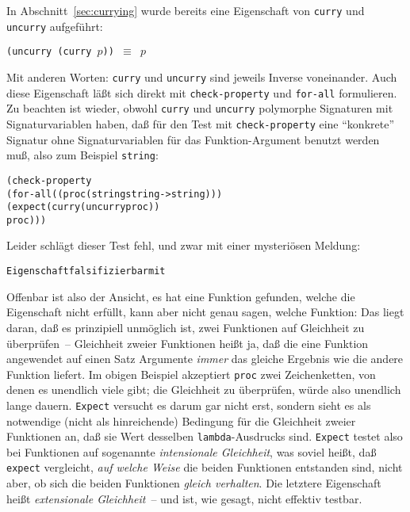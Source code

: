 In Abschnitt~\ref{sec:currying} wurde bereits eine Eigenschaft von
\texttt{curry} und
\texttt{uncurry} aufgeführt:
%
\begin{center}
  \texttt{(uncurry (curry \(p\))) \(\equiv\) \(p\)}
\end{center}
%
Mit anderen Worten: \texttt{curry} und \texttt{uncurry} sind jeweils
Inverse voneinander.  Auch diese Eigenschaft läßt sich direkt mit
\texttt{check-property} und \texttt{for-all} formulieren.  Zu beachten
ist wieder, obwohl \texttt{curry} und \texttt{uncurry} polymorphe
Signaturen mit Signaturvariablen haben, daß für den Test mit
\texttt{check-property} eine "`konkrete"' Signatur ohne
Signaturvariablen für das Funktion-Argument benutzt werden muß, also
zum Beispiel \texttt{string}:
%
\begin{alltt}
(check-property
 (for-all ((proc (string string -> string)))
   (expect (curry (uncurry proc))
           proc)))
\end{alltt}
%
Leider schlägt dieser Test fehl, und zwar mit einer mysteriösen
Meldung:
%
\begin{alltt}
Eigenschaft falsifizierbar mit 
\end{alltt}
%
Offenbar ist \drscheme{} also der Ansicht, es hat eine Funktion gefunden,
welche die Eigenschaft nicht erfüllt, kann aber nicht genau sagen,
welche Funktion: Das liegt daran, daß es prinzipiell unmöglich ist,
zwei Funktionen auf Gleichheit zu überprüfen~-- Gleichheit zweier
Funktionen heißt ja, daß die eine Funktion angewendet auf einen Satz
Argumente \emph{immer} das gleiche Ergebnis wie die andere Funktion
liefert.  Im obigen Beispiel akzeptiert \texttt{proc} zwei
Zeichenketten, von denen es unendlich viele gibt; die Gleichheit zu
überprüfen, würde also unendlich lange dauern.  \texttt{Expect}
versucht es darum gar nicht erst, sondern sieht es als notwendige
(nicht als hinreichende) Bedingung für die Gleichheit zweier
Funktionen an, daß sie Wert desselben \texttt{lambda}-Ausdrucks sind.
\texttt{Expect} testet also bei Funktionen auf sogenannte
\textit{intensionale Gleichheit}, was soviel heißt, daß
\texttt{expect} vergleicht, \emph{auf welche Weise} die beiden
Funktionen entstanden sind, nicht aber, ob sich die beiden Funktionen
\emph{gleich verhalten}.  Die letztere Eigenschaft heißt \textit{extensionale
  Gleichheit}~-- und ist, wie gesagt, nicht effektiv testbar.

